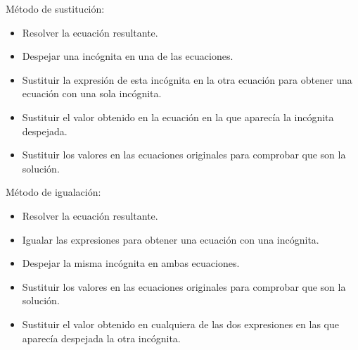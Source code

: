 \documentclass[12pt,addpoints,answers]{evalua}
\begin{document}
\begin{questions}
{\begin{choices}
                  \choice M\'etodo de sustitución:
                  \begin{itemize}
                        \item[\rule{1cm}{0.2mm}] Resolver la ecuaci\'on resultante.
                        \item[\rule{1cm}{0.2mm}] Despejar una inc\'ognita en una de las ecuaciones.
                        \item[\rule{1cm}{0.2mm}] Sustituir la expresi\'on de esta inc\'ognita en la otra ecuaci\'on para obtener una ecuaci\'on con una sola inc\'ognita.
                        \item[\rule{1cm}{0.2mm}] Sustituir el valor obtenido en la ecuaci\'on en la que aparec\'ia la inc\'ognita despejada.
                        \item[\rule{1cm}{0.2mm}] Sustituir los valores en las ecuaciones originales para comprobar que son la soluci\'on.
                  \end{itemize}

                  \choice M\'etodo de igualaci\'on:
                  \begin{itemize}
                        \item[\rule{1cm}{0.2mm}] Resolver la ecuaci\'on resultante.
                        \item[\rule{1cm}{0.2mm}] Igualar las expresiones para obtener una ecuaci\'on con una inc\'ognita.
                        \item[\rule{1cm}{0.2mm}] Despejar la misma inc\'ognita en ambas ecuaciones.
                        \item[\rule{1cm}{0.2mm}] Sustituir los valores en las ecuaciones originales para comprobar que son la soluci\'on.
                        \item[\rule{1cm}{0.2mm}] Sustituir el valor obtenido en cualquiera de las dos expresiones en las que aparec\'ia despejada la otra inc\'ognita.
                  \end{itemize}
            \end{choices}
      }


\end{questions}
\end{document}
